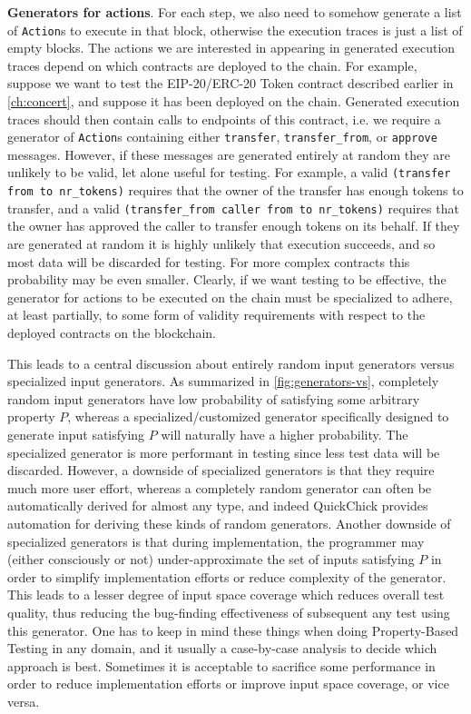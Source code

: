 \documentclass[twoside,11pt,openright]{report}
\newcommand{\pbt}{Property-Based Testing}
\newcommand{\coq}[1]{\texttt{#1}}
\begin{document}
\textbf{Generators for actions}. For each step, we also need to somehow generate a list of \coq{Action}s to execute in that block, otherwise the execution traces is just a list of empty blocks. The actions we are interested in appearing in generated execution traces depend on which contracts are deployed to the chain. For example, suppose we want to test the EIP-20/ERC-20 Token contract described earlier in \autoref{ch:concert}, and suppose it has been deployed on the chain. Generated execution traces should then contain calls to endpoints of this contract, i.e. we require a generator of \coq{Action}s containing either \coq{transfer}, \coq{transfer\_from}, or \coq{approve} messages. However, if these messages are generated entirely at random they are unlikely to be valid, let alone useful for testing. For example, a valid \coq{(transfer from to nr\_tokens)} requires that the owner of the transfer has enough tokens to transfer, and a valid \coq{(transfer\_from caller from to nr\_tokens)} requires that the owner has approved the caller to transfer enough tokens on its behalf. If they are generated at random it is highly unlikely that execution succeeds, and so most data will be discarded for testing. For more complex contracts this probability may be even smaller. Clearly, if we want testing to be effective, the generator for actions to be executed on the chain must be specialized to adhere, at least partially, to some form of validity requirements with respect to the deployed contracts on the blockchain.

This leads to a central discussion about entirely random input generators versus specialized input generators. As summarized in \autoref{fig:generators-vs}, completely random input generators have low probability of satisfying some arbitrary property $P$, whereas a specialized/customized generator specifically designed to generate input satisfying $P$ will naturally have a higher probability. The specialized generator is more performant in testing since less test data will be discarded. However, a downside of specialized generators is that they require much more user effort, whereas a completely random generator can often be automatically derived for almost any type, and indeed QuickChick provides automation for deriving these kinds of random generators. Another downside of specialized generators is that during implementation, the programmer may (either consciously or not) under-approximate the set of inputs satisfying $P$ in order to simplify implementation efforts or reduce complexity of the generator. This leads to a lesser degree of input space coverage which reduces overall test quality, thus reducing the bug-finding effectiveness of subsequent any test using this generator. One has to keep in mind these things when doing \pbt{} in any domain, and it usually a case-by-case analysis to decide which approach is best. Sometimes it is acceptable to sacrifice some performance in order to reduce implementation efforts or improve input space coverage, or vice versa.
\end{document}
